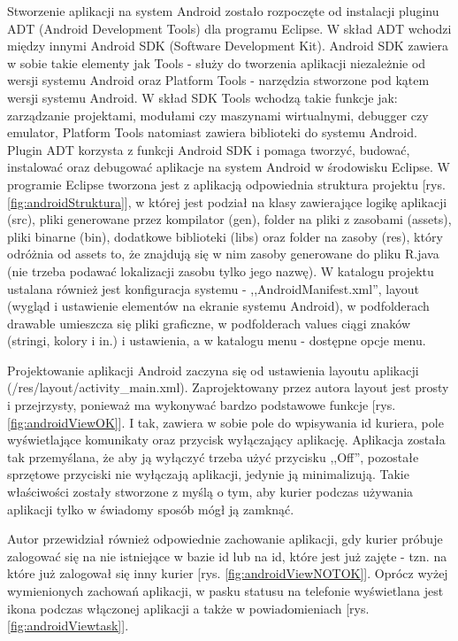 \documentclass[eng,printmode,oneside]{mgr}
\begin{document}
Stworzenie aplikacji na system Android zostało rozpoczęte od instalacji
pluginu ADT (Android Development Tools) dla programu Eclipse. W skład ADT
wchodzi między innymi Android SDK (Software Development Kit).
Android SDK zawiera w sobie takie elementy jak Tools - służy do tworzenia aplikacji niezależnie od
wersji systemu Android oraz Platform Tools - narzędzia stworzone pod kątem
wersji systemu Android. W skład SDK Tools wchodzą takie funkcje jak: zarządzanie
projektami, modułami czy maszynami wirtualnymi, debugger czy emulator,
Platform Tools natomiast zawiera biblioteki do systemu Android. Plugin ADT 
korzysta z funkcji Android SDK i pomaga tworzyć, budować, instalować oraz debugować
aplikacje na system Android w środowisku Eclipse. W programie Eclipse tworzona
jest z aplikacją odpowiednia struktura projektu [rys. \ref{fig:androidStruktura}], w
której jest podział na klasy zawierające logikę aplikacji (src), pliki
generowane przez kompilator (gen), folder na pliki z zasobami (assets), pliki
binarne (bin), dodatkowe biblioteki (libs) oraz folder na zasoby (res), który
odróżnia od assets to, że znajdują się w nim zasoby generowane do pliku R.java
(nie trzeba podawać lokalizacji zasobu tylko jego nazwę). W katalogu projektu
ustalana również jest konfiguracja systemu - ,,AndroidManifest.xml'', layout
(wygląd i ustawienie elementów na ekranie systemu Android), w podfolderach
drawable umieszcza się pliki graficzne, w podfolderach values ciągi znaków
(stringi, kolory i in.) i ustawienia, a w katalogu menu - dostępne opcje menu.

Projektowanie aplikacji Android zaczyna się od ustawienia layoutu aplikacji
(/res/layout/activity\_main.xml). Zaprojektowany przez autora layout jest
prosty i przejrzysty, ponieważ ma wykonywać bardzo podstawowe funkcje [rys.
\ref{fig:androidViewOK}]. I tak, zawiera w sobie pole do wpisywania id kuriera,
pole wyświetlające komunikaty oraz przycisk wyłączający aplikację. Aplikacja została
tak przemyślana, że aby ją wyłączyć trzeba użyć przycisku ,,Off'', pozostałe
sprzętowe przyciski nie wyłączają aplikacji, jedynie ją minimalizują. Takie
właściwości zostały stworzone z myślą o tym, aby kurier podczas używania aplikacji tylko w świadomy
sposób mógł ją zamknąć.

Autor przewidział również odpowiednie zachowanie aplikacji, gdy kurier próbuje
zalogować się na nie istniejące w bazie id lub na id, które jest już zajęte -
tzn. na które już zalogował się inny kurier [rys. \ref{fig:androidViewNOTOK}]. 
Oprócz wyżej wymienionych zachowań aplikacji, w pasku statusu na telefonie
wyświetlana jest ikona podczas włączonej aplikacji a także w
powiadomieniach [rys. \ref{fig:androidViewtask}].
\end{document}
